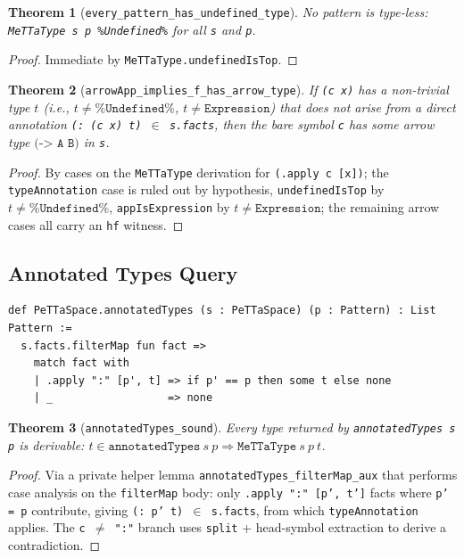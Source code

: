 \documentclass[]{article}
\newtheorem{theorem}{Theorem}
\newcommand{\code}[1]{\texttt{#1}}
\begin{document}
\begin{theorem}[\code{every\_pattern\_has\_undefined\_type}]
No pattern is type-less: \code{MeTTaType s p \%Undefined\%} for all \code{s} and \code{p}.
\end{theorem}

\begin{proof}
Immediate by \code{MeTTaType.undefinedIsTop}.
\end{proof}

\begin{theorem}[\code{arrowApp\_implies\_f\_has\_arrow\_type}]
If \code{(c x)} has a non-trivial type $t$ (i.e., $t \neq \code{\%Undefined\%}$,
$t \neq \code{Expression}$) that does not arise from a direct annotation
\code{(: (c x) t) $\in$ s.facts}, then the bare symbol \code{c} has some arrow type
$\code{(-> A B)}$ in \code{s}.
\end{theorem}

\begin{proof}
By cases on the \code{MeTTaType} derivation for \code{(.apply c [x])}; the
\code{typeAnnotation} case is ruled out by hypothesis, \code{undefinedIsTop}
by $t \neq \code{\%Undefined\%}$, \code{appIsExpression} by $t \neq \code{Expression}$;
the remaining arrow cases all carry an \code{hf} witness.
\end{proof}

\subsection{Annotated Types Query}

\begin{lstlisting}[language=lean]
def PeTTaSpace.annotatedTypes (s : PeTTaSpace) (p : Pattern) : List Pattern :=
  s.facts.filterMap fun fact =>
    match fact with
    | .apply ":" [p', t] => if p' == p then some t else none
    | _                  => none
\end{lstlisting}

\begin{theorem}[\code{annotatedTypes\_sound}]
Every type returned by \code{annotatedTypes s p} is derivable:
$t \in \code{annotatedTypes}\ s\ p \Rightarrow \code{MeTTaType}\ s\ p\ t$.
\end{theorem}

\begin{proof}
Via a private helper lemma \code{annotatedTypes\_filterMap\_aux} that performs
case analysis on the \code{filterMap} body: only \code{.apply ":" [p', t']}
facts where \code{p' = p} contribute, giving \code{(: p' t) $\in$ s.facts},
from which \code{typeAnnotation} applies.  The \code{c $\neq$ ":"} branch
uses \code{split} + head-symbol extraction to derive a contradiction.
\end{proof}
\end{document}
